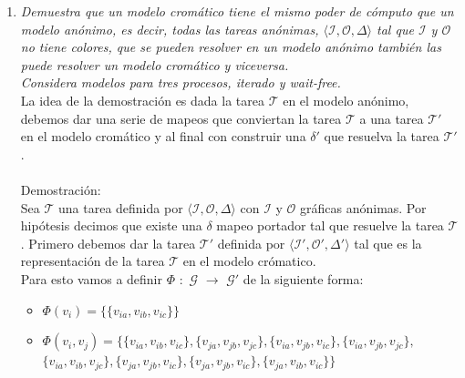 \documentclass{article}
\begin{document}
\begin{enumerate}
  \item{
      \textsl{
        Demuestra que un modelo cromático tiene el mismo poder de
        cómputo que un modelo anónimo, es decir, todas las tareas
        anónimas, $\langle\mathcal{I},\mathcal{O},\Delta\rangle$ tal
        que $\mathcal{I}$ y $\mathcal{O}$ no tiene colores, que se
        pueden resolver en un modelo anónimo también las puede
        resolver un modelo cromático y viceversa.\\
        Considera modelos para tres procesos, iterado y wait-free.\\
      }
      La idea de la demostración es dada la tarea $\mathcal{T}$ en el
      modelo anónimo, debemos dar una serie de mapeos que conviertan
      la tarea $\mathcal{T}$ a una tarea $\mathcal{T}'$ en el modelo
      cromático y al final con construir una $\delta'$ que resuelva la
      tarea $\mathcal{T}'$.\\
      \\
      Demostración:\\
      Sea $\mathcal{T}$ una tarea definida por
      $\langle\mathcal{I},\mathcal{O},\Delta\rangle$ con $\mathcal{I}$
      y $\mathcal{O}$ gráficas anónimas. Por hipótesis decimos que
      existe una $\delta$ mapeo portador tal que resuelve la tarea
      $\mathcal{T}$. Primero debemos dar la tarea $\mathcal{T}'$
      definida por $\langle\mathcal{I}',\mathcal{O}',\Delta'\rangle$
      tal que es la representación de la tarea $\mathcal{T}$ en el
      modelo crómatico. \\
      Para esto vamos a definir $\Phi$ $:$ $\mathcal{G}$
      $\xrightarrow{}$ $\mathcal{G}'$ de la siguiente forma:\\

      \begin{itemize}
        
        \item{
            $\Phi(v_i) = \{\{v_{ia}, v_{ib}, v_{ic}\}\}$
          }

          \item{
              $\Phi({v_i,v_j}) =  \{\{v_{ia}, v_{ib}, v_{ic}\},
              \{v_{ja}, v_{jb}, v_{jc}\}, \{v_{ia}, v_{jb}, v_{ic}\},
              \{v_{ia}, v_{jb}, v_{jc}\}, $\\
              $\{v_{ia}, v_{ib}, v_{jc}\},
              \{v_{ja}, v_{jb}, v_{ic}\}, \{v_{ja}, v_{jb}, v_{ic}\},
              \{v_{ja},v_{ib}, v_{ic}\}
              \}$ \\
            }
        

\end{itemize}}
\end{enumerate}
\end{document}

